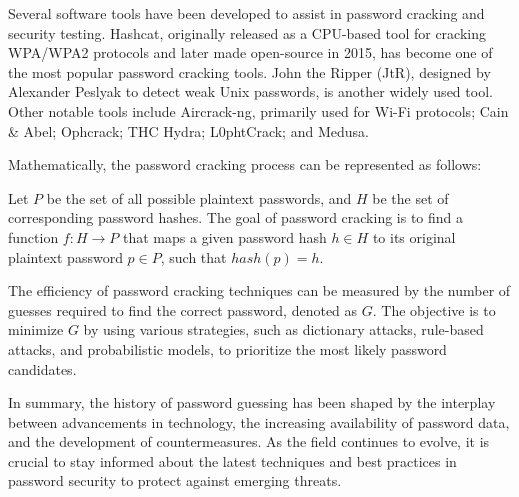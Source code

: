 Several software tools have been developed to assist in password cracking and security testing. Hashcat, originally released as a CPU-based tool for cracking WPA/WPA2 protocols and later made open-source in 2015, has become one of the most popular password cracking tools. John the Ripper (JtR), designed by Alexander Peslyak to detect weak Unix passwords, is another widely used tool. Other notable tools include Aircrack-ng, primarily used for Wi-Fi protocols; Cain \& Abel; Ophcrack; THC Hydra; L0phtCrack; and Medusa.

Mathematically, the password cracking process can be represented as follows:

Let $P$ be the set of all possible plaintext passwords, and $H$ be the set of corresponding password hashes. The goal of password cracking is to find a function $f: H \rightarrow P$ that maps a given password hash $h \in H$ to its original plaintext password $p \in P$, such that $hash(p) = h$.

The efficiency of password cracking techniques can be measured by the number of guesses required to find the correct password, denoted as $G$. The objective is to minimize $G$ by using various strategies, such as dictionary attacks, rule-based attacks, and probabilistic models, to prioritize the most likely password candidates.

In summary, the history of password guessing has been shaped by the interplay between advancements in technology, the increasing availability of password data, and the development of countermeasures. As the field continues to evolve, it is crucial to stay informed about the latest techniques and best practices in password security to protect against emerging threats.
